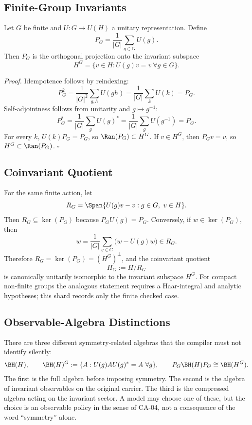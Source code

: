 \subsection{Finite-Group Invariants}

Let \(G\) be finite and \(U:G\to U(H)\) a unitary representation.  Define
\[
  P_G=\frac1{|G|}\sum_{g\in G}U(g).
\]
Then \(P_G\) is the orthogonal projection onto the invariant subspace
\[
  H^G=\{v\in H:U(g)v=v\ \forall g\in G\}.
\]

\emph{Proof.}  Idempotence follows by reindexing:
\[
  P_G^2=\frac1{|G|^2}\sum_{g,h}U(gh)
       =\frac1{|G|}\sum_k U(k)=P_G.
\]
Self-adjointness follows from unitarity and \(g\mapsto g^{-1}\):
\[
  P_G^*=\frac1{|G|}\sum_g U(g)^*
       =\frac1{|G|}\sum_g U(g^{-1})=P_G.
\]
For every \(k\), \(U(k)P_G=P_G\), so \(\Ran(P_G)\subset H^G\).  If \(v\in H^G\),
then \(P_Gv=v\), so \(H^G\subset\Ran(P_G)\). \(\square\)

\subsection{Coinvariant Quotient}

For the same finite action, let
\[
  R_G=\Span\{U(g)v-v:g\in G,\ v\in H\}.
\]
Then \(R_G\subseteq\ker(P_G)\) because \(P_GU(g)=P_G\).  Conversely, if
\(w\in\ker(P_G)\), then
\[
  w
  =
  \frac1{|G|}\sum_{g\in G}\bigl(w-U(g)w\bigr)\in R_G.
\]
Therefore \(R_G=\ker(P_G)=(H^G)^\perp\), and the coinvariant quotient
\[
  H_G:=H/R_G
\]
is canonically unitarily isomorphic to the invariant subspace \(H^G\).  For
compact non-finite groups the analogous statement requires a Haar-integral and
analytic hypotheses; this shard records only the finite checked case.

\subsection{Observable-Algebra Distinctions}

There are three different symmetry-related algebras that the compiler must not
identify silently:
\[
  \BH(H),\qquad
  \BH(H)^G:=\{A:U(g)AU(g)^*=A\ \forall g\},\qquad
  P_G\BH(H)P_G\cong \BH(H^G).
\]
The first is the full algebra before imposing symmetry.  The second is the
algebra of invariant observables on the original carrier.  The third is the
compressed algebra acting on the invariant sector.  A model may choose one of
these, but the choice is an observable policy in the sense of CA-04, not a
consequence of the word ``symmetry'' alone.

